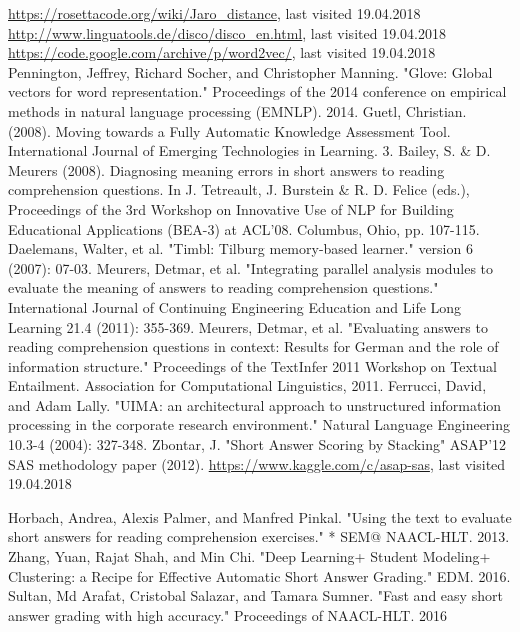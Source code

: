 \documentclass[rnd]{mas_report}
\begin{document}
\begin{thebibliography}{3}
 \url{https://rosettacode.org/wiki/Jaro_distance}, last visited 19.04.2018
 \url{http://www.linguatools.de/disco/disco_en.html}, last visited 19.04.2018
 \url{https://code.google.com/archive/p/word2vec/}, last visited 19.04.2018
 Pennington, Jeffrey, Richard Socher, and Christopher Manning. "Glove: Global vectors for word representation." Proceedings of the 2014 conference on empirical methods in natural language processing (EMNLP). 2014.
 Guetl, Christian. (2008). Moving towards a Fully Automatic Knowledge Assessment Tool. International Journal of Emerging Technologies in Learning. 3. 
 Bailey, S. \& D. Meurers (2008). Diagnosing meaning errors in short answers to reading comprehension questions. In J. Tetreault, J. Burstein \& R. D. Felice (eds.), Proceedings of the 3rd Workshop on Innovative Use of NLP for Building Educational Applications (BEA-3) at ACL'08. Columbus, Ohio, pp. 107-115.
 Daelemans, Walter, et al. "Timbl: Tilburg memory-based learner." version 6 (2007): 07-03.
 Meurers, Detmar, et al. "Integrating parallel analysis modules to evaluate the meaning of answers to reading comprehension questions." International Journal of Continuing Engineering Education and Life Long Learning 21.4 (2011): 355-369.
 Meurers, Detmar, et al. "Evaluating answers to reading comprehension questions in context: Results for German and the role of information structure." Proceedings of the TextInfer 2011 Workshop on Textual Entailment. Association for Computational Linguistics, 2011.
 Ferrucci, David, and Adam Lally. "UIMA: an architectural approach to unstructured information processing in the corporate research environment." Natural Language Engineering 10.3-4 (2004): 327-348.
 Zbontar, J. "Short Answer Scoring by Stacking" ASAP'12 SAS methodology paper (2012).
 \url{https://www.kaggle.com/c/asap-sas}, last visited 19.04.2018



 Horbach, Andrea, Alexis Palmer, and Manfred Pinkal. "Using the text to evaluate short answers for reading comprehension exercises." * SEM@ NAACL-HLT. 2013.
 Zhang, Yuan, Rajat Shah, and Min Chi. "Deep Learning+ Student Modeling+ Clustering: a Recipe for Effective Automatic Short Answer Grading." EDM. 2016.
 Sultan, Md Arafat, Cristobal Salazar, and Tamara Sumner. "Fast and easy short answer grading with high accuracy." Proceedings of NAACL-HLT. 2016


\end{thebibliography}
\end{document}
